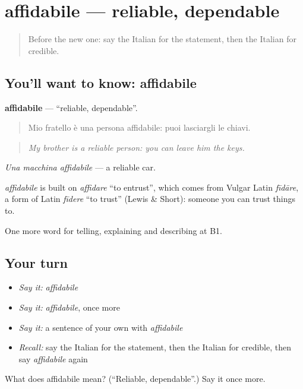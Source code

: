 \section[affidabile]{affidabile — reliable, dependable}

\label{lesson:IT-C345-affidabile}



\begin{quote}
Before the new one: say the Italian for the statement, then the Italian for credible.
\end{quote}

\subsection*{You'll want to know: affidabile}
\textbf{affidabile} — \textquotedblleft{}reliable, dependable\textquotedblright{}.

\begin{quote}
Mio fratello è una persona affidabile: puoi lasciargli le chiavi.
\end{quote}

\begin{quote}
\emph{My brother is a reliable person: you can leave him the keys.}
\end{quote}

\emph{Una macchina affidabile} — a reliable car.

\begin{cousinweb}
\emph{affidabile} is built on \emph{affidare} \textquotedblleft{}to entrust\textquotedblright{}, which comes from Vulgar Latin \emph{fīdāre}, a form of Latin \emph{fīdere} \textquotedblleft{}to trust\textquotedblright{} (Lewis \& Short): someone you can trust things to.
\end{cousinweb}

\begin{grammarlens}[title={What you've built}]
One more word for telling, explaining and describing at B1.
\end{grammarlens}

\subsection*{Your turn}
\begin{itemize}
\raggedright
  \item \emph{Say it:} \emph{affidabile}
  \item \emph{Say it:} \emph{affidabile}, once more
  \item \emph{Say it:} a sentence of your own with \emph{affidabile}
  \item \emph{Recall:} say the Italian for the statement, then the Italian for credible, then say \emph{affidabile} again
\end{itemize}

\begin{tcolorbox}[breakable,colback=teal!4,colframe=teal!35!black,title={Before you move on}]
What does affidabile mean? (\textquotedblleft{}Reliable, dependable\textquotedblright{}.) Say it once more.
\end{tcolorbox}
